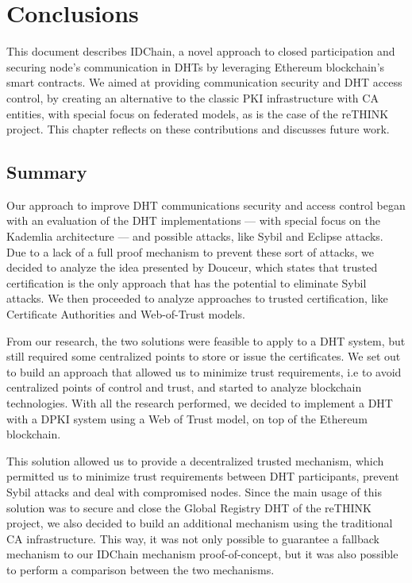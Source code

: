 \chapter{Conclusions}
\label{chapter:conclusion}

This document describes IDChain, a novel approach to closed participation and securing node's communication in DHTs by leveraging Ethereum blockchain's smart contracts.
We aimed at providing communication security and DHT access control, by creating an alternative to the classic PKI infrastructure with \acl{CA} entities, with special focus on federated models, as is the case of the reTHINK project.
This chapter reflects on these contributions and discusses future work.

\section{Summary}
\label{section:summary}
Our approach to improve DHT communications security and access control began with an evaluation of the DHT implementations — with special focus on the Kademlia architecture — and possible attacks, like Sybil and Eclipse attacks.
Due to a lack of a full proof mechanism to prevent these sort of attacks, we decided to analyze the idea presented by Douceur\cite{Douceur2002}, which states that trusted certification is the only approach that has the potential to eliminate Sybil attacks.
We then proceeded to analyze approaches to trusted certification, like Certificate Authorities and Web-of-Trust models.

From our research, the two solutions were feasible to apply to a DHT system, but still required some centralized points to store or issue the certificates.
We set out to build an approach that allowed us to minimize trust requirements, i.e to avoid centralized points of control and trust, and started to analyze blockchain technologies.
With all the research performed, we decided to implement a DHT with a DPKI system using a Web of Trust model, on top of the Ethereum blockchain.

This solution allowed us to provide a decentralized trusted mechanism, which permitted us to minimize trust requirements between DHT participants, prevent Sybil attacks and deal with compromised nodes.
Since the main usage of this solution was to secure and close the Global Registry DHT of the reTHINK project, we also decided to build an additional mechanism using the traditional CA infrastructure.
This way, it was not only possible to guarantee a fallback mechanism to our IDChain mechanism proof-of-concept, but it was also possible to perform a comparison between the two mechanisms.

